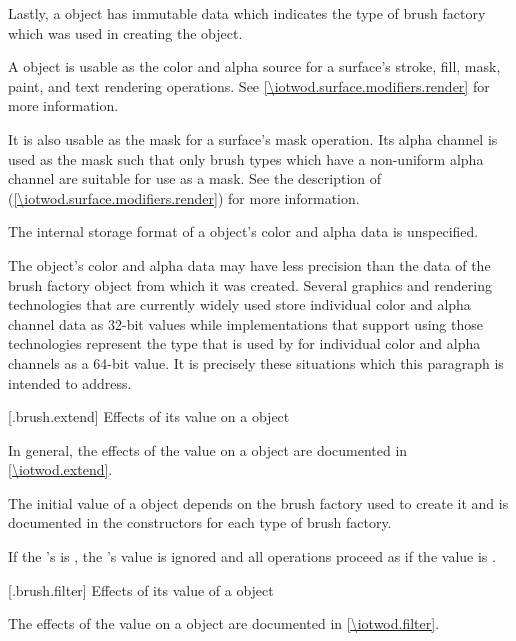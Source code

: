 \pnum
Lastly, a  object has immutable  data which indicates the type of brush factory which was used in creating the  object.

\pnum
A  object is usable as the color and alpha source for a surface's stroke, fill, mask, paint, and text rendering operations. See \ref{\iotwod.surface.modifiers.render} for more information.

\pnum
It is also usable as the mask for a surface's mask operation. Its alpha channel is used as the mask such that only brush types which have a non-uniform alpha channel are suitable for use as a mask. See the description of  (\ref{\iotwod.surface.modifiers.render}) for more information.

\pnum
The internal storage format of a  object's color and alpha data is unspecified.

\pnum
The  object's color and alpha data may have less precision than the data of the brush factory object from which it was created.
\enternote
Several graphics and rendering technologies that are currently widely used store individual color and alpha channel data as 32-bit  values while \Cpp implementations that support using those technologies represent the  type that is used by  for individual color and alpha channels as a 64-bit value. It is precisely these situations which this paragraph is intended to address.
\exitnote

 [\iotwod.brush.extend] {Effects of its  value on a  object}

\pnum
In general, the effects of the  value on a  object are documented in \ref{\iotwod.extend}.

\pnum
The initial  value of a  object depends on the brush factory used to create it and is documented in the  constructors for each type of brush factory.

\pnum
If the 's  is , the 's  value is ignored and all operations proceed as if the  value is .

 [\iotwod.brush.filter] {Effects of its  value of a  object}

\pnum
The effects of the  value on a  object are documented in \ref{\iotwod.filter}.

